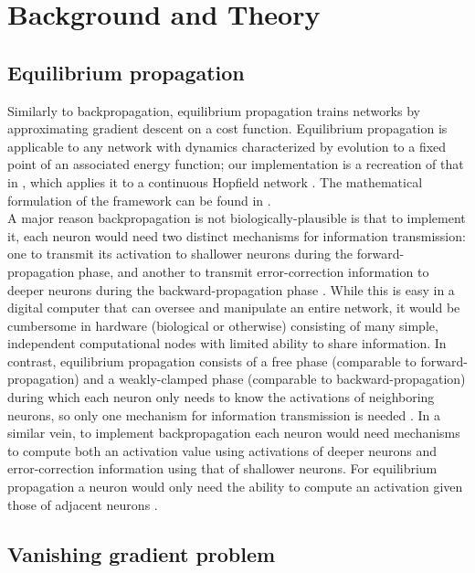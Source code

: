 \documentclass[format=sigconf]{acmart}
\newcommand{\npar}{\\\indent}
\begin{document}
\section{Background and Theory}

\subsection{Equilibrium propagation}
\label{sec:eqp_formulation}

Similarly to backpropagation, equilibrium propagation \cite{scellier17} trains networks by approximating gradient descent on a cost function. Equilibrium propagation is applicable to any network with dynamics characterized by evolution to a fixed point of an associated energy function; our implementation is a recreation of that in \cite{scellier17}, which applies it to a continuous Hopfield network \cite{hopfield1984}. The mathematical formulation of the framework can be found in \cite{scellier17}.
\npar
A major reason backpropagation is not biologically-plausible is that to implement it, each neuron would need two distinct mechanisms for information transmission: one to transmit its activation to shallower neurons during the forward-propagation phase, and another to transmit error-correction information to deeper neurons during the backward-propagation phase \cite{bengio2015}. While this is easy in a digital computer that can oversee and manipulate an entire network, it would be cumbersome in hardware (biological or otherwise) consisting of many simple, independent computational nodes with limited ability to share information. In contrast, equilibrium propagation consists of a free phase (comparable to forward-propagation) and a weakly-clamped phase (comparable to backward-propagation) during which each neuron only needs to know the activations of neighboring neurons, so only one mechanism for information transmission is needed \cite{scellier17}. In a similar vein, to implement backpropagation each neuron would need mechanisms to compute both an activation value using activations of deeper neurons and error-correction information using that of shallower neurons. For equilibrium propagation a neuron would only need the ability to compute an activation given those of adjacent neurons \cite{scellier17}.

\subsection{Vanishing gradient problem}
\label{sec:vangrad}
\end{document}
